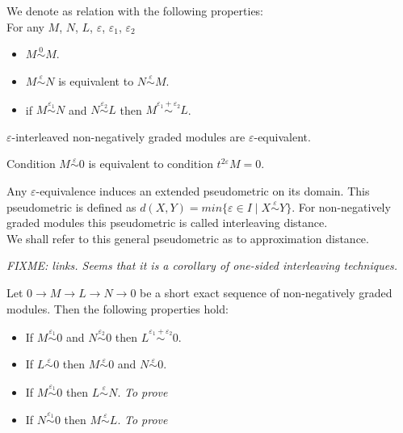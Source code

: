 \begin{definition}
  We denote as  relation with the following properties:\\
  For any $M$, $N$, $L$, $\varepsilon$, $\varepsilon_1$, $\varepsilon_2$
  \begin{itemize}
    \item $M \stackrel{0}{\sim} M$.
    \item $M \stackrel{\varepsilon}{\sim} N$ is equivalent to $N \stackrel{\varepsilon}{\sim} M$.
    \item if $M \stackrel{\varepsilon_1}{\sim} N$ and $N \stackrel{\varepsilon_2}{\sim} L$ then $M \stackrel{\varepsilon_1 + \varepsilon_2}{\sim} L$.
  \end{itemize}
\end{definition}

\begin{proposition}
  $\varepsilon$-interleaved non-negatively graded modules are $\varepsilon$-equivalent.
\end{proposition}

\begin{remark}
  \label{epstriv}
  Condition $M \stackrel{\varepsilon}{\sim} 0$ is equivalent to condition $t^{2\varepsilon}M = 0$.
\end{remark}

\begin{definition}
  Any $\varepsilon$-equivalence induces an extended pseudometric on its domain. This pseudometric is defined as $d(X,Y) = min\{\varepsilon \in I\;|\;X \stackrel{\varepsilon}{\sim} Y\}$. For non-negatively graded modules this pseudometric is called interleaving distance. {\cite[Definition 2.12]{GS16}}\\
  We shall refer to this general pseudometric as to approximation distance.
\end{definition}

\textit{FIXME: links. Seems that it is a corollary of one-sided interleaving techniques.}
\begin{lemma}
  Let $0 \to M \to L \to N \to 0$ be a short exact sequence of non-negatively graded modules. Then the following properties hold:
  \begin{itemize}
    \item If $M \stackrel{\varepsilon_1}{\sim} 0$ and $N \stackrel{\varepsilon_2}{\sim} 0$ then $L \stackrel{\varepsilon_1 + \varepsilon_2}{\sim} 0$. {\cite[Proposition 4.6]{GS16}}
    \item If $L \stackrel{\varepsilon}{\sim} 0$ then $M \stackrel{\varepsilon}{\sim} 0$ and $N \stackrel{\varepsilon}{\sim} 0$.
    \item If $M \stackrel{\varepsilon_1}{\sim} 0$ then $L \stackrel{\varepsilon}{\sim} N$. \textit{To prove}
    \item If $N \stackrel{\varepsilon_1}{\sim} 0$ then $M \stackrel{\varepsilon}{\sim} L$. \textit{To prove}
  \end{itemize}
\end{lemma}

